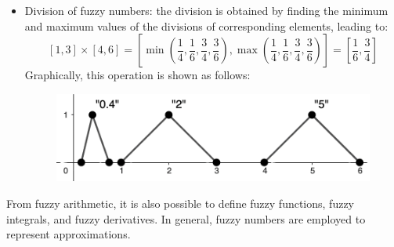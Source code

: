 \begin{example}
\begin{itemize}
\begin{figure}[H]
            \end{figure}
        \item Division of fuzzy numbers: the division is obtained by finding the minimum and maximum values of the divisions of corresponding elements, leading to:
        \[[1,3] \times [4,6]=\left[\min\left(\dfrac{1}{4}, \dfrac{1}{6}, \dfrac{3}{4}, \dfrac{3}{6}\right),\max\left(\dfrac{1}{4}, \dfrac{1}{6}, \dfrac{3}{4}, \dfrac{3}{6}\right)\right]=\left[\dfrac{1}{6},\dfrac{3}{4}\right]\]
        Graphically, this operation is shown as follows:
            \begin{figure}[H]
                \centering
                \includegraphics[width=0.5\linewidth]{images/division.png}
            \end{figure}
    \end{itemize}
\end{example}
From fuzzy arithmetic, it is also possible to define fuzzy functions, fuzzy integrals, and fuzzy derivatives. 
In general, fuzzy numbers are employed to represent approximations.